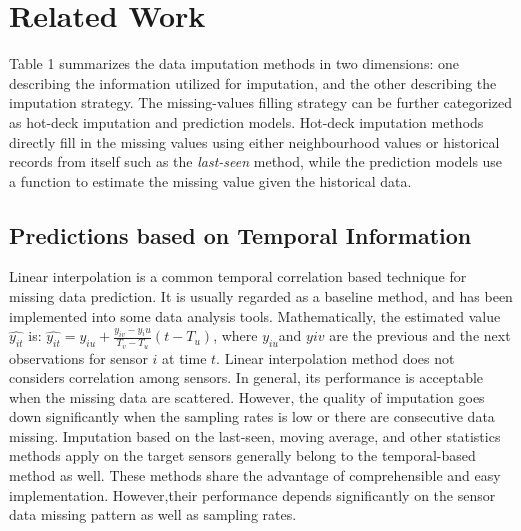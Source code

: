 \section{Related Work}\label{sec:rw}



Table 1 summarizes the data imputation methods in two dimensions: one describing the information utilized for imputation, and the other describing the imputation strategy. The missing-values filling strategy can be further categorized as hot-deck imputation and prediction models\cite{Garcia:KNNreview}. 
Hot-deck imputation methods directly fill in the missing values using either neighbourhood values or historical records from itself such as the \textit{last-seen} method, while the prediction models use a function to estimate the missing value given the historical data. 



\subsection{Predictions based on Temporal Information }
Linear interpolation is a common temporal correlation based technique for missing data prediction. 
It is usually regarded as a baseline method, and has been implemented into some data analysis tools. Mathematically, the estimated value $\hat{y_{it}}$ is:
$\hat{y_{it}} = y_{iu} + \frac{y_{iv}-y{_iu}}{T_v-T_u}(t-T_u)$, where $y_{iu}$and $y{iv}$ are the previous and the next observations for sensor $i$ at time $t$.
Linear interpolation method does not considers correlation among sensors. In general, its performance is acceptable when the missing data are scattered. 
However, the quality of imputation goes down significantly when the sampling rates is low or there are consecutive data missing. 
Imputation based on the last-seen, moving average, and other statistics methods apply on the target sensors generally belong to the temporal-based method as well.
These methods share the advantage of comprehensible and easy implementation. 
However,their performance depends significantly on the sensor data missing pattern as well as sampling rates.   
